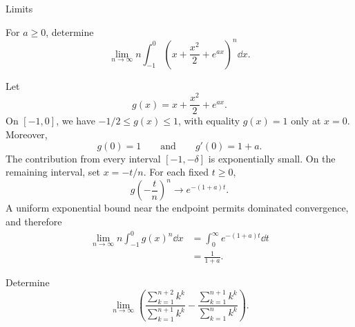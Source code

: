 \begin{expectedproblemgroup}{Limits}
        \begin{expectedsubproblem}
            For $a\geq0$, determine
            \[
                \lim\limits_{n\to\infty}
                n\int_{-1}^{0}
                \left(x+\frac{x^2}{2}+e^{ax}\right)^n\dd x.
            \]
        \end{expectedsubproblem}

        \begin{expectedsubsolution}
            Let
            \[
                g(x)=x+\frac{x^2}{2}+e^{ax}.
            \]
            On $[-1,0]$, we have $-1/2\leq g(x)\leq1$, with equality $g(x)=1$
            only at $x=0$. Moreover,
            \[
                g(0)=1
                \qquad\text{and}\qquad
                g'(0)=1+a.
            \]
            The contribution from every interval $[-1,-\delta]$ is exponentially
            small. On the remaining interval, set $x=-t/n$. For each fixed $t\geq0$,
            \[
                g\left(-\frac{t}{n}\right)^n
                \longrightarrow
                e^{-(1+a)t}.
            \]
            A uniform exponential bound near the endpoint permits dominated
            convergence, and therefore
            \[
                \begin{aligned}
                    \lim\limits_{n\to\infty}
                    n\int_{-1}^{0}g(x)^n\dd x
                    &=
                    \int_0^\infty e^{-(1+a)t}\dd t\\
                    &=
                    \boxed{\frac{1}{1+a}}.
                \end{aligned}
            \]
        \end{expectedsubsolution}

        \begin{expectedsubproblem}
            Determine
            \[
                \lim\limits_{n\to\infty}
                \left(
                    \frac{\displaystyle\sum_{k=1}^{n+2}k^k}
                    {\displaystyle\sum_{k=1}^{n+1}k^k}
                    -
                    \frac{\displaystyle\sum_{k=1}^{n+1}k^k}
                    {\displaystyle\sum_{k=1}^{n}k^k}
                \right).
            \]
        \end{expectedsubproblem}


\end{expectedproblemgroup}
